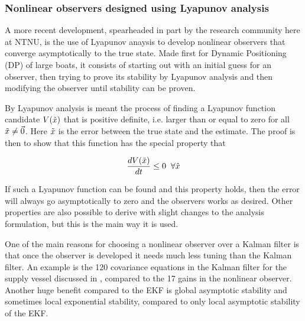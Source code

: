 \subsubsection{Nonlinear observers designed using Lyapunov analysis}

A more recent development, spearheaded in part by the research community here at NTNU, is the use of Lyapunov anaysis to develop nonlinear observers that converge asymptotically to the true state\cite{PassiveFossen}. Made first for Dynamic Positioning (DP) of large boats, it consists of starting out with an initial guess for an observer, then trying to prove its stability by Lyapunov analysis and then modifying the observer until stability can be proven. 

By Lyapunov analysis\cite{Lyapunov} is meant the process of finding a Lyapunov function candidate $V(\Tilde{x})$ that is positive definite, i.e. larger than or equal to zero for all $\Tilde{x}\neq \Vec{0}$. Here $\Tilde{x}$ is the error between the true state and the estimate. The proof is then to show that this function has the special property that

\begin{equation}
    \frac{d V(\Tilde{x})}{dt} \leq 0 \;\; \forall \hat{x}
\end{equation}

If such a Lyapunov function can be found and this property holds, then the error will always go asymptotically to zero and the observers works as desired. Other properties are also possible to derive with slight changes to the analysis formulation, but this is the main way it is used. 

One of the main reasons for choosing a nonlinear observer over a Kalman filter is that once the observer is developed it needs much less tuning than the Kalman filter. An example is the 120 covariance equations in the Kalman filter for the supply vessel discussed in \cite{PassiveFossen}, compared to the 17 gains in the nonlinear observer. Another huge benefit compared to the EKF is global asymptotic stability and sometimes local exponential stability, compared to only local asymptotic stability of the EKF. 

